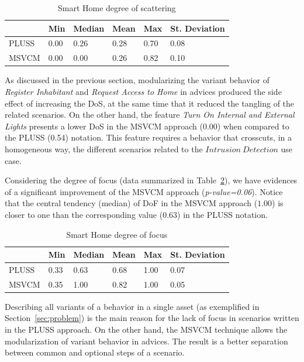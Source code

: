\begin{table}[htb]
\centering
\caption{Smart Home degree of scattering}
\label{tab:sh-dos}
\begin{small}
\begin{tabular}{llllll} \hline
					& Min 	& Median 	& Mean 	& Max 	& St. Deviation \\ \hline 
	PLUSS			& 0.00  & 0.26   	& 0.28  & 0.70 	& 0.08 			\\
	MSVCM	& 0.00  & 0.00  	& 0.26 	& 0.82 & 0.10  		\\ \hline	
\end{tabular}
\end{small}
\end{table}

As discussed in the previous section, modularizing the variant behavior of
\emph{Register Inhabitant} and \emph{Request Access to Home} in advices produced the side effect of increasing the DoS, at the same time that it reduced
the tangling of the related scenarios. On the other hand, the feature \emph{Turn
On Internal and External Lights} presents a lower DoS in the MSVCM approach
(0.00) when compared to the PLUSS (0.54) notation. This feature requires a
behavior that crosscuts, in a homogeneous way, the different scenarios related to
the $Intrusion\ Detection$ use case.


Considering the degree of focus (data summarized in Table~\ref{tab:sh-dof}), we
have evidences of a significant improvement of the MSVCM approach
(\emph{p-value=0.06}). Notice that the central tendency (median) of DoF in the
MSVCM approach ($1.00$) is closer to one than the corresponding value
($0.63$) in the PLUSS notation.

\begin{table}[htb] \centering
\caption{Smart Home degree of focus}
\label{tab:sh-dof}
\begin{small}
\begin{tabular}{llllll} \hline
					& Min 	& Median 	& Mean 	& Max 	& St. Deviation \\ \hline 
	PLUSS			& 0.33  & 0.63   	& 0.68  & 1.00 	& 0.07 			\\
	MSVCM			& 0.35  & 1.00   	& 0.82 	& 1.00 	& 0.05			\\ \hline	
\end{tabular}
\end{small}
\end{table}

Describing all variants of a behavior in a single asset
(as exemplified in Section~\ref{sec:problem}) is the main reason for the lack of
focus in scenarios written in the PLUSS approach. On the other hand, the MSVCM technique
allows the modularization of variant behavior in advices. The result
is a better separation between common and optional steps of a scenario.

